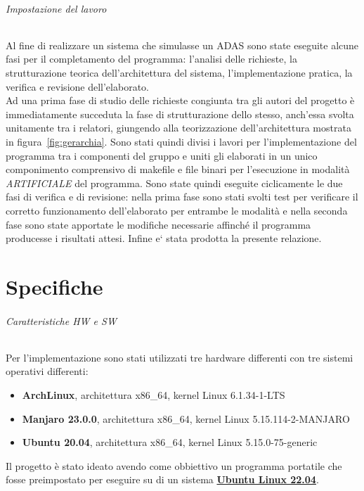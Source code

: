 \documentclass[11pt, openany]{article}
\theoremstyle{definition}
\theoremstyle{plain}
\theoremstyle{remark}
\begin{document}
		\paragraph{Impostazione del lavoro}
			Al fine di realizzare un sistema che simulasse un ADAS sono state eseguite alcune fasi per il completamento del programma: l'analisi delle richieste, la strutturazione teorica dell'architettura del sistema, l'implementazione pratica, la verifica e revisione dell'elaborato.\\
			Ad una prima fase di studio delle richieste congiunta tra gli autori del progetto è immediatamente succeduta la fase di strutturazione dello stesso, anch'essa svolta unitamente tra i relatori, giungendo alla teorizzazione dell'architettura mostrata in figura~\ref{fig:gerarchia}. Sono stati quindi divisi i lavori per l'implementazione del programma tra i componenti del gruppo e uniti gli elaborati in un unico componimento comprensivo di makefile e file binari per l'esecuzione in modalità \textit{ARTIFICIALE} del programma. Sono state quindi eseguite ciclicamente le due fasi di verifica e di revisione: nella prima fase sono stati svolti test per verificare il corretto funzionamento dell'elaborato per entrambe le modalità e nella seconda fase sono state apportate le modifiche necessarie affinché il programma producesse i risultati attesi. Infine e` stata prodotta la presente relazione.
	\part{Specifiche}
		\paragraph{Caratteristiche HW e SW}
		Per l'implementazione sono stati utilizzati tre hardware differenti con tre sistemi operativi differenti:
		\begin{itemize}
			\item \textbf{ArchLinux}, architettura x86\_64, kernel Linux 6.1.34-1-LTS
			\item \textbf{Manjaro 23.0.0}, architettura x86\_64, kernel Linux 5.15.114-2-MANJARO
			\item \textbf{Ubuntu 20.04}, architettura x86\_64, kernel Linux 5.15.0-75-generic
		\end{itemize}
		Il progetto è stato ideato avendo come obbiettivo un programma portatile che fosse preimpostato per eseguire su di un sistema \textbf{\underline{Ubuntu Linux 22.04}}.
\end{document}
